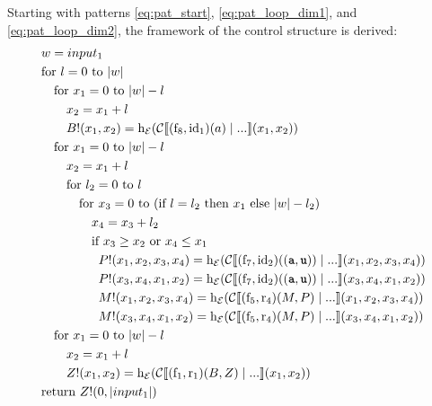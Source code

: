\documentclass[
    a4paper,
    12pt,
    twoside,
    BCOR=12mm,
    parskip=half,
    chapterprefix,
    numbers=noenddot,
    bibliography=totoc
]{scrbook}
\begin{document}
Starting with patterns \ref{eq:pat_start}, \ref{eq:pat_loop_dim1}, and \ref{eq:pat_loop_dim2}, the framework of the control structure is derived:
\begin{align}
  &w = input_1 \nonumber\\
  &\text{for $l=0$ to $|w|$} \nonumber\\
  &\quad\text{for $x_1=0$ to $|w|-l$} \nonumber\\
  &\quad\quad x_2 = x_1+l \nonumber\\
  &\quad\quad B!(x_1,x_2) = \op{h}_\mathcal{E}(\mathcal{C}\llbracket (\op{f}_8,\op{id}_1)(a) \mid ... \rrbracket (x_1,x_2)) \nonumber\\        
  &\quad\text{for $x_1=0$ to $|w|-l$} \nonumber\\
  &\quad\quad x_2 = x_1+l \nonumber\\
  &\quad\quad \text{for $l_2=0$ to $l$} \nonumber\\
  &\quad\quad\quad \text{for $x_3=0$ to $($if $l=l_2$ then $x_1$ else $|w|-l_2)$} \nonumber\\
  &\quad\quad\quad\quad x_4 = x_3 + l_2 \nonumber\\
  &\quad\quad\quad\quad \text{if $x_3 \geq x_2$ or $x_4 \leq x_1$} \nonumber\\
  &\quad\quad\quad\quad\;\; P!(x_1,x_2,x_3,x_4) = \op{h}_\mathcal{E}(\mathcal{C}\llbracket (\op{f}_7,\op{id}_2)((\ts{a},\ts{u})) \mid ... \rrbracket (x_1,x_2,x_3,x_4)) \label{eq:exp_1p}\\
  &\quad\quad\quad\quad\;\; P!(x_3,x_4,x_1,x_2) = \op{h}_\mathcal{E}(\mathcal{C}\llbracket (\op{f}_7,\op{id}_2)((\ts{a},\ts{u})) \mid ... \rrbracket (x_3,x_4,x_1,x_2)) \nonumber\\
  &\quad\quad\quad\quad\;\; M!(x_1,x_2,x_3,x_4) = \op{h}_\mathcal{E}(\mathcal{C}\llbracket (\op{f}_5,\op{r}_4)(M,P) \mid ... \rrbracket (x_1,x_2,x_3,x_4)) \label{eq:exp_1k}\\
  &\quad\quad\quad\quad\;\; M!(x_3,x_4,x_1,x_2) = \op{h}_\mathcal{E}(\mathcal{C}\llbracket (\op{f}_5,\op{r}_4)(M,P) \mid ... \rrbracket (x_3,x_4,x_1,x_2)) \nonumber\\
  &\quad\text{for $x_1=0$ to $|w|-l$} \nonumber\\
  &\quad\quad x_2 = x_1+l \nonumber\\
  &\quad\quad Z!(x_1,x_2) = \op{h}_\mathcal{E}(\mathcal{C}\llbracket (\op{f}_1,\op{r}_1)(B,Z) \mid ... \rrbracket (x_1,x_2)) \label{eq:exp_1z}\\
  &\text{return } Z!(0,|input_1|) \nonumber
\end{align}
\end{document}
